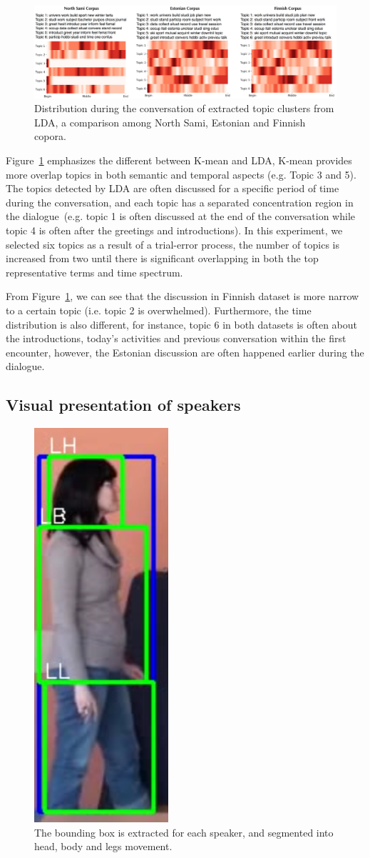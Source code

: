 \documentclass[10pt,journal,compsoc]{IEEEtran}
\begin{document}
\begin{figure}[t]
  \centering
  \includegraphics[width=\linewidth]{figures/lda_topic_clustering.pdf}
  \caption{Distribution during the conversation of extracted topic clusters from LDA, a comparison among North Sami, Estonian and Finnish copora.}
  \label{fig:lda_topic}
\end{figure}
Figure~\ref{fig:lda_topic} emphasizes the different between K-mean and LDA, K-mean provides more overlap topics in both semantic and temporal aspects (e.g. Topic 3 and 5). The topics detected by LDA are often discussed for a specific period of time during the conversation, and each topic has a separated concentration region in the dialogue (e.g. topic 1 is often discussed at the end of the conversation while topic 4 is often after the greetings and introductions). In this experiment, we selected six topics as a result of a trial-error process, the number of topics is increased from two until there is significant overlapping in both the top representative terms and time spectrum.

From Figure~\ref{fig:lda_topic}, we can see that the discussion in Finnish dataset is more narrow to a certain topic (i.e. topic 2 is overwhelmed). Furthermore, the time distribution is also different, for instance, topic 6 in both datasets is often about the introductions, today's activities and previous conversation within the first encounter, however, the Estonian discussion are often happened earlier during the dialogue.

\subsection{Visual presentation of speakers}

\begin{figure}
  \centering
  \includegraphics[width=0.18\linewidth]{images/boundingbox.png}
  \caption{The bounding box is extracted for each speaker, and segmented into head, body and legs movement.}
  \label{fig:bb}
\end{figure}
\end{document}
